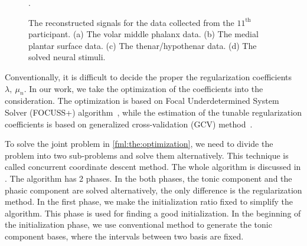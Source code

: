 \documentclass[10pt,conference]{ieeeconf}
\begin{document}
\begin{figure*}[htbp]
  \centering
  \DeclareGraphicsExtensions.
  \caption{The reconstructed signals for the data collected from the $11^{\mathrm{th}}$ participant. (a) The volar middle phalanx data. (b) The medial plantar surface data. (c) The thenar/hypothenar data. (d) The solved neural stimuli.} \label{fig:results}
\end{figure*}

Conventionally, it is difficult to decide the proper the regularization coefficients $\lambda,~\mu_n$. In our work, we take the optimization of the coefficients into the consideration. The optimization is based on Focal Underdetermined System Solver (FOCUSS+) algorithm~\cite{murray2005visual}, while the estimation of the tunable regularization coefficients is based on  generalized cross-validation (GCV) method~\cite{zdunek2008improved}. 

To solve the joint problem in \eqref{fml:the:optimization}, we need to divide the problem into two sub-problems and solve them alternatively. This technique is called concurrent coordinate descent method. The whole algorithm is discussed in . The algorithm has 2 phases. In the both phases, the tonic component and the phasic component are solved alternatively, the only difference is the regularization method. In the first phase, we make the initialization ratio fixed to simplify the algorithm. This phase is used for finding a good initialization. In the beginning of the initialization phase, we use conventional method to generate the tonic component bases, where the intervals between two basis are fixed.
\end{document}

